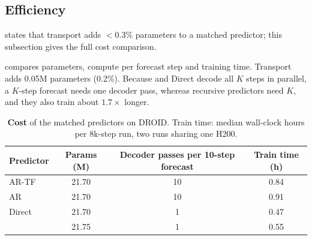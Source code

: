 \FloatBarrier
\subsection{Efficiency}\label{app:cost}
 states that transport adds $<\!0.3\%$ parameters to a matched predictor; this subsection gives the full
cost comparison.

 compares parameters, compute per forecast step and
training time. Transport adds 0.05M parameters (0.2\%). Because \ours{} and Direct decode all $K$ steps in
parallel, a $K$-step forecast needs one decoder pass, whereas recursive predictors need $K$, and they also train about
$1.7{\times}$ longer.
\begin{table}[t]
\centering
\caption{\textbf{Cost} of the matched predictors on DROID. Train time: median wall-clock hours per 8k-step run, two runs sharing one H200.}
\label{tab:efficiency}
\scriptsize
\begin{tabular}{@{}lccc@{}}
\toprule
Predictor & Params (M) & Decoder passes per 10-step forecast & Train time (h) \\
\midrule
AR-TF       & 21.70 & 10 & 0.84 \\
AR          & 21.70 & 10 & 0.91 \\
Direct      & 21.70 & 1 & 0.47 \\
\ours{}     & 21.75 & 1 & 0.55 \\
\bottomrule
\end{tabular}
\end{table}

